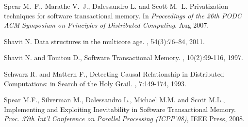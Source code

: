\begin{thebibliography}{99}
{
Spear M.~F., Marathe V.~J., Dalessandro L. and Scott M.~L.
\newblock Privatization techniques for software transactional memory.
\newblock In {\em Proceedings of the 26th PODC ACM Symposium on Principles of
  Distributed Computing}. Aug 2007.








Shavit N.
\newblock Data structures in the multicore age.
, 54(3):76--84, 2011.

% 



Shavit N. and Touitou D., 
\newblock Software Transactional Memory. 
, 10(2):99-116, 1997. 


% 
% 
% 
% 
% 



Schwarz R. and Mattern F., 
\newblock Detecting  Causal Relationship in Distributed  Computations: in  Search of
the Holy Grail. 
, 7:149-174, 1993. 



Spear M.F., Silverman M., Dalessandro L., Michael M.M.  and Scott M.L., 
Implementing and Exploiting Inevitability in Software Transactional Memory.
{\it Proc. 37th Int'l Conference on Parallel Processing (ICPP'08)}, 
IEEE Press, 2008. 


}
\end{thebibliography}
